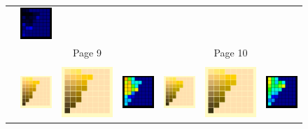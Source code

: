 \begin{figure}[t!]
{\begin{tabular}{ccccccc}
			&
			\includegraphics[width=.155\linewidth]{img/results_uplift_page10_diff_ourFL11.png}\\
			& & Page 9 & & & Page 10 & \\
			\vspace{0.1em} \\ 
			\raisebox{0.4cm}[0pt][0pt]{\parbox[c][0pt][c]{0cm}{\hspace{-1.5em}\\[20pt]}\par}
			&\includegraphics[width=.155\linewidth]{img/results_uplift_page11_originalFL11.png}
			&
			\includegraphics[width=.155\linewidth]{img/results_uplift_page11_sigmoidFL11.png}
			& 
			\includegraphics[width=.155\linewidth]{img/results_uplift_page11_diff_sigmoidFL11.png}
			&\quad
			\includegraphics[width=.155\linewidth]{img/results_uplift_page12_originalFL11.png}
			&
			\includegraphics[width=.155\linewidth]{img/results_uplift_page12_sigmoidFL11.png}
			&
			\includegraphics[width=.155\linewidth]{img/results_uplift_page12_diff_sigmoidFL11.png}

\end{tabular}}
\end{figure}
